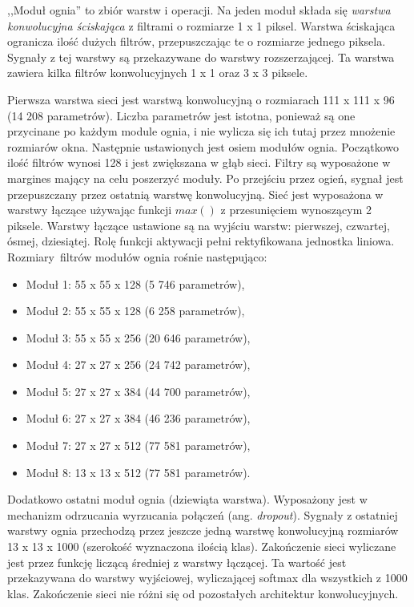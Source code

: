 \documentclass[12pt,a4paper,twoside,titlepage,openright]{book}
\begin{document}
,,Moduł ognia'' to zbiór warstw i operacji. Na jeden moduł składa się \textit{warstwa konwolucyjna ściskająca} z filtrami o rozmiarze 1 x 1 piksel. Warstwa ściskająca ogranicza ilość dużych filtrów, przepuszczając te o rozmiarze jednego piksela. Sygnały z tej warstwy są przekazywane do warstwy rozszerzającej. Ta warstwa zawiera kilka filtrów konwolucyjnych 1 x 1 oraz 3 x 3 piksele. 

Pierwsza warstwa sieci jest warstwą konwolucyjną o rozmiarach 111 x 111 x 96 (14 208 parametrów). Liczba parametrów jest istotna, ponieważ są one przycinane po każdym module ognia, i nie wylicza się ich tutaj przez mnożenie rozmiarów okna. Następnie ustawionych jest osiem modułów ognia. Początkowo ilość filtrów wynosi 128 i jest zwiększana w głąb sieci. Filtry są wyposażone w margines mający na celu poszerzyć moduły. Po przejściu przez ogień, sygnał jest przepuszczany przez ostatnią warstwę konwolucyjną. Sieć jest wyposażona w warstwy łączące używając funkcji $max()$ z przesunięciem wynoszącym 2 piksele. Warstwy łączące ustawione są na wyjściu warstw: pierwszej, czwartej, ósmej, dziesiątej. Rolę funkcji aktywacji pełni rektyfikowana jednostka liniowa. Rozmiary filtrów modułów ognia rośnie następująco:
\begin{itemize}
\item Moduł 1: 55 x 55 x 128 (5 746 parametrów),
\item Moduł 2: 55 x 55 x 128 (6 258 parametrów), 
\item Moduł 3: 55 x 55 x 256 (20 646 parametrów),
\item Moduł 4: 27 x 27 x 256 (24 742 parametrów),
\item Moduł 5: 27 x 27 x 384 (44 700 parametrów),
\item Moduł 6: 27 x 27 x 384 (46 236 parametrów),
\item Moduł 7: 27 x 27 x 512 (77 581 parametrów),
\item Moduł 8: 13 x 13 x 512 (77 581 parametrów).
\end{itemize}
Dodatkowo ostatni moduł ognia (dziewiąta warstwa). Wyposażony jest w mechanizm odrzucania wyrzucania połączeń (ang. \textit{dropout}). Sygnały z ostatniej warstwy ognia przechodzą przez jeszcze jedną warstwę konwolucyjną rozmiarów 13 x 13 x 1000 (szerokość wyznaczona ilością klas).
Zakończenie sieci wyliczane jest przez funkcję liczącą średniej z warstwy łączącej. Ta wartość jest przekazywana do warstwy wyjściowej, wyliczającej softmax dla wszystkich z 1000 klas. Zakończenie sieci nie różni się od pozostałych architektur konwolucyjnych.
\end{document}
